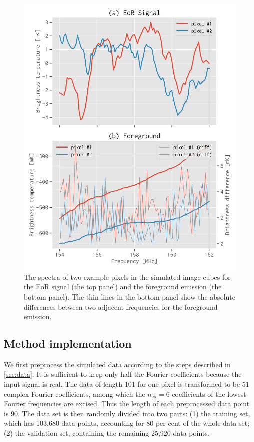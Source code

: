 \documentclass[letters,a4paper,fleqn,usenatbib]{mnras}
\newcommand{\R}[1]{\mathrm{#1}}
\begin{document}
\begin{figure}
  \centering
  \includegraphics[width=\columnwidth]{simudata}
  \caption{\label{fig:simudata}%
    The spectra of two example pixels in the simulated image cubes
    for the EoR signal (the top panel) and the foreground emission
    (the bottom panel).
    The thin lines in the bottom panel show the absolute differences
    between two adjacent frequencies for the foreground emission.
  }
\end{figure}


\subsection{Method implementation}
\label{sec:implementation}

We first preprocess the simulated data according to the steps described
in \autoref{sec:data}.
It is sufficient to keep only half the Fourier coefficients because the
input signal is real.
The data of length 101 for one pixel is transformed to be
51 complex Fourier coefficients, among which the $n_{\R{ex}} = 6$
coefficients of the lowest Fourier frequencies are excised.
Thus the length of each preprocessed data point is 90.
The data set is then randomly divided into two parts:
(1) the training set, which has 103,680 data points, accounting for
80 per cent of the whole data set;
(2) the validation set, containing the remaining 25,920 data points.
\end{document}
